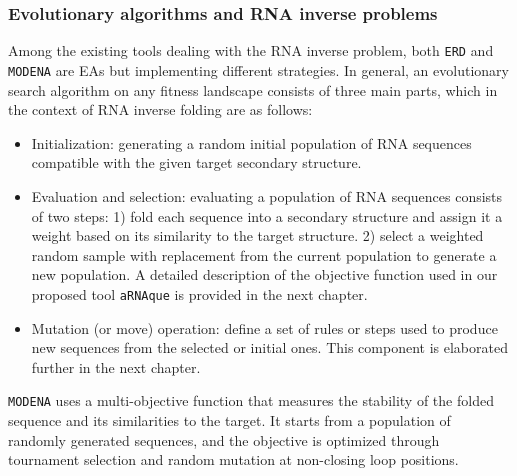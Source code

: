 \subsubsection{Evolutionary algorithms and \ac{RNA} inverse problems}
Among the existing tools dealing with the \ac{RNA} inverse problem, both \texttt{ERD} \cite{esmaili2014evolutionary, esmaili2015erd} and \texttt{MODENA} \cite{modena_2012} are \acp{EA} but implementing different strategies. 
In general, an evolutionary search algorithm on any fitness landscape consists of three main parts, which in the context of \ac{RNA} inverse folding are as follows: %
\begin{itemize}
	\item Initialization: generating a random initial population of \ac{RNA} sequences compatible with the given target secondary structure.
	\item Evaluation and selection: evaluating a population of \ac{RNA} sequences consists of two steps: 1) fold each sequence into a secondary structure and assign it a weight based on its similarity to the target structure. 2) select a weighted random sample with replacement from the current population to generate a new population. A detailed description of the objective function used in our proposed tool \texttt{aRNAque} is provided in the next chapter. 
	\item Mutation (or move) operation: define a set of rules or steps used to produce new sequences from the selected or initial ones. This component is elaborated further in the next chapter.
	
\end{itemize}

\texttt{MODENA} uses a multi-objective function that measures the stability of the folded sequence and its similarities to the target. It starts from a population of randomly generated sequences, and the objective is optimized through tournament selection and random mutation at non-closing loop positions. 

